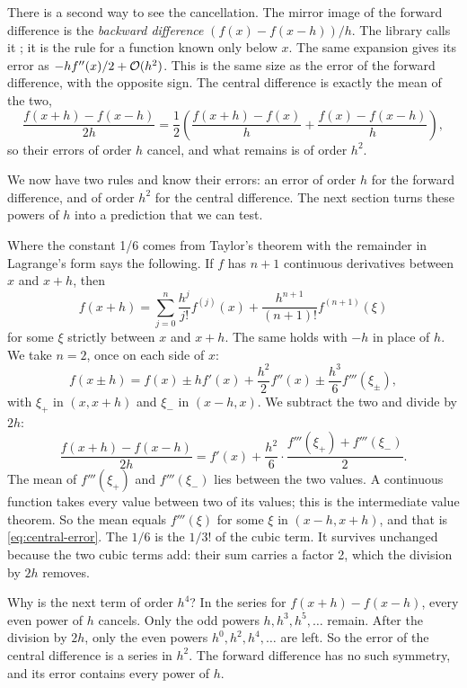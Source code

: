 There is a second way to see the cancellation. The mirror image of the forward difference is the \emph{backward
difference} $(f(x) - f(x - h)) / h$. The library calls it ; it is the rule for a function known
only below $x$. The same expansion gives its error as $-h f''(x) / 2 + \mathcal{O}(h^2)$. This is
the same size as the error of the forward difference, with the opposite sign. The central difference is exactly the
mean of the two,
\begin{equation*}
  \frac{f(x + h) - f(x - h)}{2h}
  = \frac{1}{2} \left( \frac{f(x + h) - f(x)}{h} + \frac{f(x) - f(x - h)}{h} \right),
\end{equation*}
so their errors of order $h$ cancel, and what remains is of order $h^2$.

We now have two rules and know their errors: an error of order $h$ for the forward difference, and of order $h^2$ for
the central difference. The next section turns these powers of $h$ into a prediction that we can test.

\begin{sidebar}[label=sb:remainder]{Where the constant 1/6 comes from}
Taylor's theorem with the remainder in Lagrange's form says the following. If $f$ has $n + 1$ continuous derivatives
between $x$ and $x + h$, then
\begin{equation*}
  f(x + h) = \sum_{j=0}^{n} \frac{h^j}{j!} f^{(j)}(x) + \frac{h^{n+1}}{(n+1)!} f^{(n+1)}(\xi)
\end{equation*}
for some $\xi$ strictly between $x$ and $x + h$. The same holds with $-h$ in place of $h$.\cite{burden2016} We take
$n = 2$, once on each side of $x$:
\begin{equation*}
  f(x \pm h) = f(x) \pm h f'(x) + \frac{h^2}{2} f''(x) \pm \frac{h^3}{6} f'''(\xi_\pm),
\end{equation*}
with $\xi_+$ in $(x, x + h)$ and $\xi_-$ in $(x - h, x)$. We subtract the two and divide by $2h$:
\begin{equation*}
  \frac{f(x + h) - f(x - h)}{2h} = f'(x) + \frac{h^2}{6} \cdot \frac{f'''(\xi_+) + f'''(\xi_-)}{2}.
\end{equation*}
The mean of $f'''(\xi_+)$ and $f'''(\xi_-)$ lies between the two values. A continuous function takes every value
between two of its values; this is the intermediate value theorem. So the mean equals $f'''(\xi)$ for some $\xi$ in
$(x - h, x + h)$, and that is \cref{eq:central-error}. The $1/6$ is the $1/3!$ of the cubic term. It survives
unchanged because the two cubic terms add: their sum carries a factor 2, which the division by $2h$ removes.

Why is the next term of order $h^4$? In the series for $f(x + h) - f(x - h)$, every even power of $h$ cancels. Only
the odd powers $h, h^3, h^5, \ldots$ remain. After the division by $2h$, only the even powers $h^0, h^2, h^4,
\ldots$ are left. So the error of the central difference is a series in $h^2$. The forward difference has no such
symmetry, and its error contains every power of $h$.
\end{sidebar}

